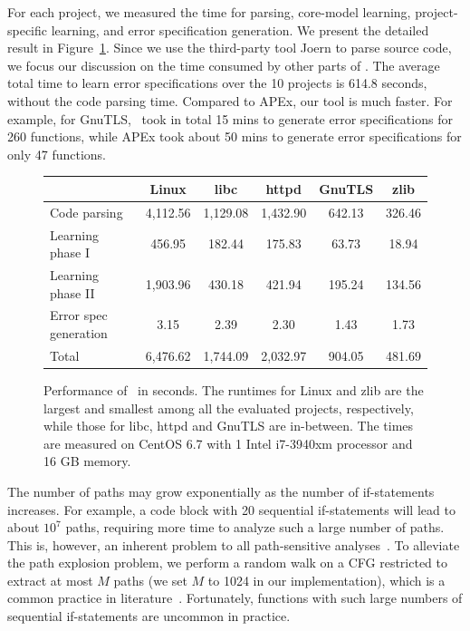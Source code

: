 \documentclass[12pt]{report}	%
\begin{document}
For each project, we measured the time for 
parsing, core-model learning, project-specific learning, 
and error specification generation.
We present the detailed result in Figure~\ref{fig:evalhperformance}.
Since we use the third-party tool Joern to parse source code, we 
focus our discussion on the time consumed by other parts of \newTool.
%
The average total time to learn error specifications over the 10 
projects is 614.8 seconds,
without the code parsing time.
Compared to APEx,
our tool is much faster.
For example, for GnuTLS, \newTool\ took in total 15 mins to generate 
error specifications for 260 functions,
while APEx took about 50 mins to generate error specifications 
for only 47 functions. 


\begin{figure}[t]
\centering
\begin{tabular}{l | c | c| c| c | c }
\toprule
& Linux & libc & httpd & GnuTLS & zlib \\
\midrule
Code parsing & 4,112.56 & 1,129.08 & 1,432.90 & 642.13 & 326.46 \\
Learning phase I & 456.95 & 182.44 & 175.83 & 63.73 & 18.94 \\
Learning phase II & 1,903.96 & 430.18 & 421.94 & 195.24 & 134.56 \\
Error spec generation & 3.15 & 2.39 & 2.30 & 1.43 & 1.73 \\
\midrule
Total & 6,476.62 & 1,744.09 & 2,032.97 & 904.05 & 481.69 \\
\bottomrule
\end{tabular}
\caption{Performance of \newTool\ in seconds.
The runtimes for Linux and zlib are the largest and smallest among all the evaluated projects, respectively,
while those for libc, httpd and GnuTLS are in-between.
The times are measured on CentOS 6.7 with 1 Intel i7-3940xm processor and 16 GB memory.}
\label{fig:evalhperformance}
\end{figure}

The number of paths may grow exponentially as 
the number of if-statements increases.
For example, 
a code block with 20 sequential if-statements
will lead to about $10^7$ paths,
requiring more time to analyze such a large number of paths.
%
This is, however, an inherent problem to all path-sensitive analyses~\cite{Dillig:2008:SCS:1375581.1375615}.
%
To alleviate the path explosion problem,
we perform a random walk on a CFG restricted to extract at most $M$ paths
(we set $M$ to 1024 in our implementation),
which is a common practice in literature~\cite{defreez2018path}.
%
Fortunately, functions with such
large numbers of sequential if-statements are uncommon in practice.
\end{document}
